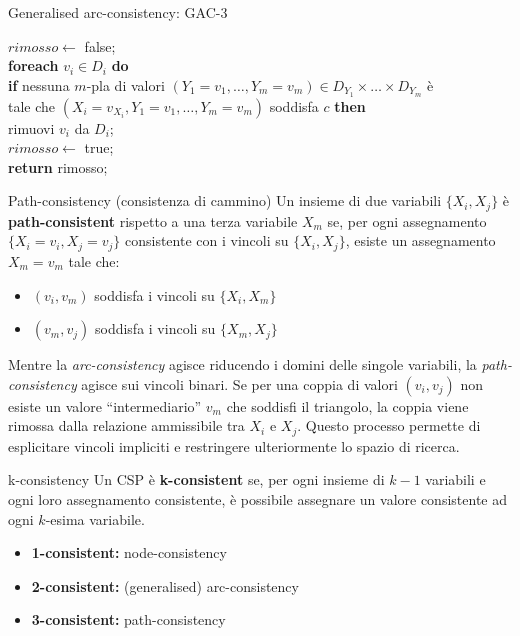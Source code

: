 \documentclass[a4paper,11pt]{report}
\begin{document}
\begin{gframe}{Generalised arc-consistency: GAC-3}{}
\begin{tcolorbox}[colback=gray!10, colframe=gray!10, arc=4pt, boxrule=0pt, left=5pt, right=5pt, top=5pt, bottom=5pt]
\begin{tabbing}
        \> $rimosso \leftarrow$ false; \\
        \> \textbf{foreach} $v_i \in D_i$ \textbf{do} \\
        \> \> \textbf{if} nessuna $m$-pla di valori $(Y_1=v_1, \dots, Y_m=v_m) \in D_{Y_1} \times \dots \times D_{Y_m}$ è \\
        \> \> \> tale che $(X_i=v_{X_i}, Y_1=v_1, \dots, Y_m=v_m)$ soddisfa $c$ \textbf{then} \\
        \> \> \> rimuovi $v_i$ da $D_i$; \\
        \> \> \> $rimosso \leftarrow$ true; \\
        \> \textbf{return} rimosso;
    \end{tabbing}
\end{tcolorbox}
\end{gframe}

\begin{defframe}{Path-consistency (consistenza di cammino)}{}
    Un insieme di due variabili $\{X_i, X_j\}$ è \textbf{path-consistent} rispetto a una terza variabile $X_m$ se, per ogni assegnamento $\{X_i = v_i, X_j = v_j\}$ consistente con i vincoli su $\{X_i, X_j\}$, esiste un assegnamento $X_m = v_m$ tale che:
    \begin{itemize}
        \item $(v_i, v_m)$ soddisfa i vincoli su $\{X_i, X_m\}$
        \item $(v_m, v_j)$ soddisfa i vincoli su $\{X_m, X_j\}$
    \end{itemize}
\end{defframe}
    \begin{gframe}{}
 Mentre la \textit{arc-consistency} agisce riducendo i domini delle singole variabili, la \textit{path-consistency} agisce sui vincoli binari. Se per una coppia di valori $(v_i, v_j)$ non esiste un valore ``intermediario'' $v_m$ che soddisfi il triangolo, la coppia viene rimossa dalla relazione ammissibile tra $X_i$ e $X_j$. Questo processo permette di esplicitare vincoli impliciti e restringere ulteriormente lo spazio di ricerca.
    \end{gframe}

\begin{defframe}{k-consistency}{}
    Un CSP è \textbf{k-consistent} se, per ogni insieme di $k-1$ variabili e ogni loro assegnamento consistente, è possibile assegnare un valore consistente ad ogni $k$-esima variabile.
    \begin{itemize}
        \item \textbf{1-consistent:} node-consistency
        \item \textbf{2-consistent:} (generalised) arc-consistency
        \item \textbf{3-consistent:} path-consistency
    \end{itemize}
\end{defframe}
\end{document}
